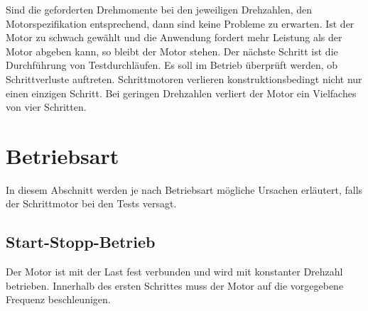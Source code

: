 {{{Sind die geforderten Drehmomente bei den jeweiligen Drehzahlen, den Motorspezifikation entsprechend, dann sind keine Probleme zu erwarten. Ist der Motor zu schwach gewählt und die Anwendung fordert mehr Leistung als der Motor abgeben kann, so bleibt der Motor stehen. Der nächste Schritt ist die Durchführung von Testdurchläufen. Es soll im Betrieb überprüft werden, ob Schrittverluste auftreten. Schrittmotoren verlieren konstruktionsbedingt nicht nur einen einzigen Schritt. Bei geringen Drehzahlen verliert der Motor ein Vielfaches von vier Schritten.\cite{Faulhaber:2020}

\section{Betriebsart}

In diesem Abschnitt werden je nach Betriebsart mögliche Ursachen erläutert, falls der Schrittmotor bei den Tests versagt.

\subsection{Start-Stopp-Betrieb}

Der Motor ist mit der Last fest verbunden und wird mit konstanter Drehzahl betrieben. Innerhalb des ersten Schrittes muss der Motor auf die vorgegebene Frequenz beschleunigen.\cite{Faulhaber:2020} 
\begin{figure}[!ht]
	\centering
	

\end{figure}}}}
